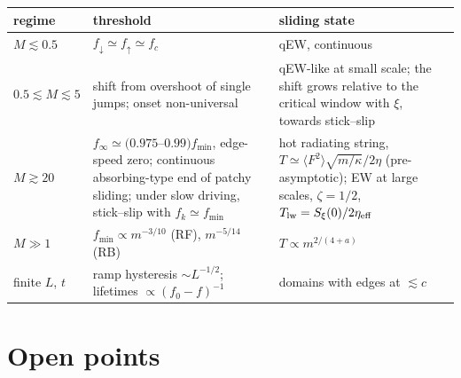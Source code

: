 \documentclass[10pt,a4paper]{article}
\newcommand{\fd}{f_\downarrow}
\newcommand{\fu}{f_\uparrow}
\newcommand{\fcs}{f_c}
\begin{document}
\begin{center}\small
\begin{tabular}{p{2.3cm}p{6.2cm}p{6.2cm}}
\toprule
regime & threshold & sliding state \\
\midrule
$M\lesssim0.5$ & $\fd\simeq\fu\simeq\fcs$ & qEW, continuous \\
$0.5\lesssim M\lesssim5$ & shift from overshoot of single jumps; onset non-universal & qEW-like at small scale; the shift grows relative to the critical window with $\xi$, towards stick--slip \\
$M\gtrsim20$ & $f_\infty\simeq(0.975$--$0.99)f_{\min}$, edge-speed zero; continuous absorbing-type end of patchy sliding; under slow driving, stick--slip with $f_k\simeq f_{\min}$ & hot radiating string, $T\simeq\langle F^2\rangle\sqrt{m/\kappa}/2\eta$ (pre-asymptotic); EW at large scales, $\zeta=1/2$, $T_{\rm lw}=S_\xi(0)/2\eta_{\rm eff}$ \\
$M\gg1$ & $f_{\min}\propto m^{-3/10}$ (RF), $m^{-5/14}$ (RB) & $T\propto m^{2/(4+a)}$ \\
finite $L$, $t$ & ramp hysteresis $\sim L^{-1/2}$; lifetimes $\propto(f_0-f)^{-1}$ & domains with edges at $\lesssim c$ \\
\bottomrule
\end{tabular}
\end{center}

\section{Open points}
\end{document}
